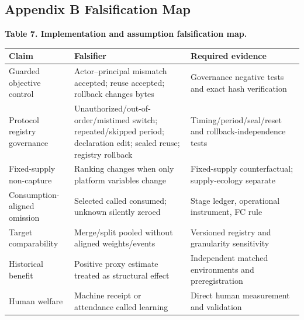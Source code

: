\documentclass[
  11pt]{article}
\begin{document}
\subsection{Appendix B Falsification
Map}\label{appendix-b-falsification-map}

\textbf{Table 7. Implementation and assumption falsification map.}

\begin{longtable}[]{@{}
  >{\raggedright\arraybackslash}p{}
  >{\raggedright\arraybackslash}p{}
  >{\raggedright\arraybackslash}p{}@{}}
\toprule\noalign{}
\begin{minipage}[b]{\linewidth}\raggedright
Claim
\end{minipage} & \begin{minipage}[b]{\linewidth}\raggedright
Falsifier
\end{minipage} & \begin{minipage}[b]{\linewidth}\raggedright
Required evidence
\end{minipage} \\
\midrule\noalign{}
\endhead
\bottomrule\noalign{}
\endlastfoot
Guarded objective control & Actor--principal mismatch accepted; reuse
accepted; rollback changes bytes & Governance negative tests and exact
hash verification \\
Protocol registry governance & Unauthorized/out-of-order/mistimed
switch; repeated/skipped period; declaration edit; sealed reuse;
registry rollback & Timing/period/seal/reset and rollback-independence
tests \\
Fixed-supply non-capture & Ranking changes when only platform variables
change & Fixed-supply counterfactual; supply-ecology separate \\
Consumption-aligned omission & Selected called consumed; unknown
silently zeroed & Stage ledger, operational instrument, FC rule \\
Target comparability & Merge/split pooled without aligned weights/events
& Versioned registry and granularity sensitivity \\
Historical benefit & Positive proxy estimate treated as structural
effect & Independent matched environments and preregistration \\
Human welfare & Machine receipt or attendance called learning & Direct
human measurement and validation \\
\end{longtable}
\end{document}
